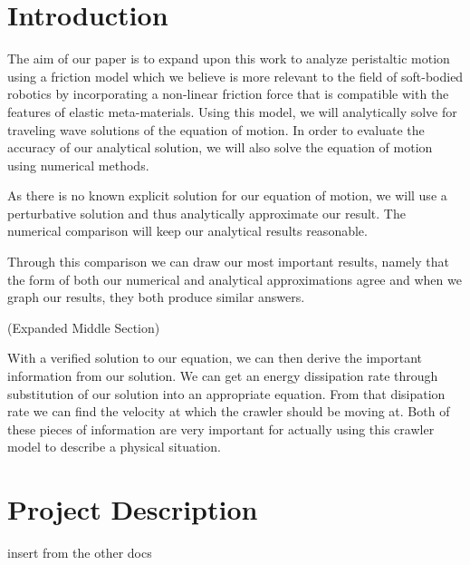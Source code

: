 \documentclass{article}
\begin{document}
\section{Introduction}
\par The aim of our paper is to expand upon this work to analyze peristaltic motion using a friction model which we believe is more relevant to the field of soft-bodied robotics by incorporating a non-linear friction force that is compatible with the features of elastic meta-materials. Using this model, we will analytically solve for traveling wave solutions of the equation of motion. In order to evaluate the accuracy of our analytical solution, we will also solve the equation of motion using numerical methods.
\par As there is no known explicit solution for our equation of motion, we will use a perturbative solution and thus analytically approximate our result. The numerical comparison will keep our analytical results reasonable.
\par Through this comparison we can draw our most important results, namely that the form of both our numerical and analytical approximations agree and when we graph our results, they both produce similar answers. 
\par (Expanded Middle Section)
\par With a verified solution to our equation, we can then derive the important information from our solution. We can get an energy dissipation rate through substitution of our solution into an appropriate equation. From that disipation rate we can find the velocity at which the crawler should be moving at. Both of these pieces of information are very important for actually using this crawler model to describe a physical situation.

\section{Project Description}
\par insert from the other docs
\end{document}
